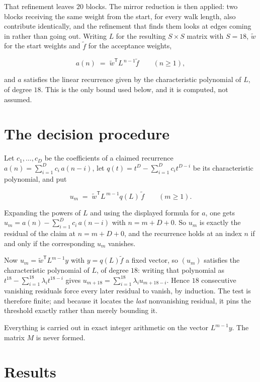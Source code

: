 \documentclass[11pt]{article}
\theoremstyle{definition}
\begin{document}
That refinement leaves $20$ blocks. The mirror reduction is then applied: two blocks receiving the same weight from the start, for every walk length, also contribute identically, and the refinement that finds them looks at edges coming in rather than going out. Writing $L$ for the resulting $S \times S$ matrix with $S = 18$, $\tilde w$ for the start weights and $\tilde f$ for the acceptance weights,

\[a(n) \;=\; \tilde w^{\mathsf T} L^{\,n-1} \tilde f \qquad (n \ge 1),\]

and $a$ satisfies the linear recurrence given by the characteristic polynomial of $L$, of degree $18$. This is the only bound used below, and it is computed, not assumed.

\section{The decision procedure}

Let $c_1,\dots,c_D$ be the coefficients of a claimed recurrence $a(n) = \sum_{i=1}^{D} c_i\,a(n-i)$, let $q(t) = t^{D} - \sum_{i=1}^{D} c_i t^{D-i}$ be its characteristic polynomial, and put

\[u_m \;=\; \tilde w^{\mathsf T} L^{\,m-1} q(L)\,\tilde f \qquad (m \ge 1).\]

Expanding the powers of $L$ and using the displayed formula for $a$, one gets $u_m = a(n) - \sum_{i=1}^{D} c_i\,a(n-i)$ with $n = m + D + 0$. So $u_m$ is exactly the residual of the claim at $n = m + D + 0$, and the recurrence holds at an index $n$ if and only if the corresponding $u_m$ vanishes.

Now $u_m = \tilde w^{\mathsf T} L^{m-1} y$ with $y = q(L)\tilde f$ a fixed vector, so $(u_m)$ satisfies the characteristic polynomial of $L$, of degree $18$: writing that polynomial as $t^{18} - \sum_{i=1}^{18} \lambda_i t^{18-i}$ gives $u_{m+18} = \sum_{i=1}^{18} \lambda_i u_{m+18-i}$. Hence $18$ consecutive vanishing residuals force every later residual to vanish, by induction. The test is therefore finite; and because it locates the {\itshape last} nonvanishing residual, it pins the threshold exactly rather than merely bounding it.

Everything is carried out in exact integer arithmetic on the vector $L^{m-1}y$. The matrix $M$ is never formed.

\section{Results}
\end{document}
